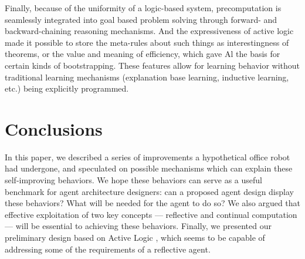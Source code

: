 \documentclass{llncs}
\begin{document}
Finally, because of the uniformity of a logic-based system, precomputation
is seamlessly integrated into goal based problem solving through forward-
and backward-chaining reasoning mechanisms. And the expressiveness of
active logic made it possible to store the meta-rules about such things as
interestingness of theorems, or the value and meaning of efficiency, which
gave Al the basis for certain kinds of bootstrapping.  These features allow
for learning behavior without traditional learning mechanisms (explanation
base learning, inductive learning, etc.) being explicitly programmed.

%
%
%


\section{Conclusions}

In this paper, we described a series of improvements a hypothetical office
robot had undergone, and speculated on possible mechanisms which can
explain these self-improving behaviors.  We hope these behaviors can serve
as a useful benchmark for agent architecture designers: can a proposed
agent design display these behaviors?  What will be needed for the agent to
do so?  We also argued that effective exploitation of two key concepts ---
reflective and continual computation --- will be essential to achieving
these behaviors.  Finally, we presented our preliminary design based on
Active Logic
\cite{elgot-drapkin/perlis:reasoning:jetai,elgot-drapkin/kraus/miller/nirkhe/perlis1996:active_logics},
which seems to be capable of addressing some of the requirements of a
reflective agent.
\end{document}
